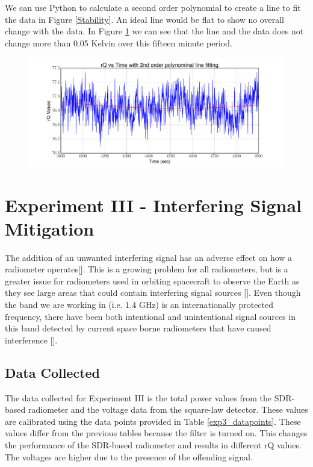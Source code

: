 We can use Python to calculate a second order polynomial to create a line to fit the data in Figure \ref{Stability}.  An ideal line would be flat to show no overall change with the data.  In Figure \ref{Stability_calib} we can see that the line and the data does not change more than 0.05 Kelvin over this fifteen minute period.

\begin{figure}[h!tb] \centering
\includegraphics[width=\textwidth]{Experiments/Exp2/calib_line_fitting.pdf}
\label{Stability_calib}
\end{figure}

\section{Experiment III - Interfering Signal Mitigation} \label{Exp3_results}

The addition of an unwanted interfering signal has an adverse effect on how a radiometer operates[\cite{Ellingson}].  This is a growing problem for all radiometers, but is a greater issue for radiometers used in orbiting spacecraft to observe the Earth as they see large areas that could contain interfering signal sources [\cite{DeRooRFI}].  Even though the band we are working in (i.e. 1.4 GHz) is an internationally protected frequency, there have been both intentional and unintentional signal sources in this band detected by current space borne radiometers that have caused interference [\cite{Forte}].

\subsection{Data Collected}

The data collected for Experiment III is the total power values from the SDR-based radiometer and the voltage data from the square-law detector.  These values are calibrated using the data points provided in Table \ref{exp3_datapoints}.  These values differ from the previous tables because the filter is turned on.  This changes the performance of the SDR-based radiometer and results in different rQ values.  The voltages are higher due to the presence of the offending signal.

